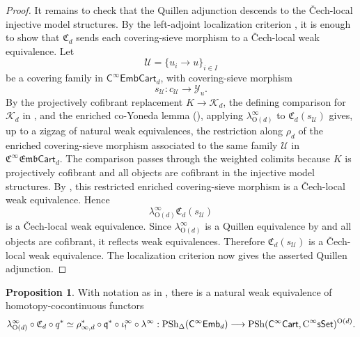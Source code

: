 \documentclass{amsart}
\newcommand{\cat}[1]{\mathsf{#1}}
\newcommand{\sset}{\cat{sSet}}
\newcommand{\CsSet}{\textnormal{C}^{\infty}\sset}
\newcommand{\Cart}{\cat{C}^{\infty}\cat{Cart}}
\newcommand{\fembnoniso}[1]{\cat{C}^{\infty}\cat{Emb}_{#1}}
\newcommand{\fembcartnoniso}[1]{\cat{C}^{\infty}\cat{EmbCart}_{#1}}
\newcommand{\fembcart}[1]{\mathfrak{C}^{\infty}\mathfrak{Emb}\cat{Cart}_{#1}}
\newcommand{\psh}{\mathrm{PSh}}
\newcommand{\spsh}{\mathrm{PSh}_{\Delta}}
\newcommand{\Cc}{\mathfrak{C}}
\newcommand{\Yo}{\mathscr{Y}}
\theoremstyle{definition}
\newtheorem{proposition}[equation]{Proposition}
\numberwithin{equation}{subsection}
\numberwithin{subsubsection}{subsection}
\begin{document}
\begin{proof}
  It remains to check that the Quillen adjunction
   descends to the \v{C}ech-local
  injective model
  structures. By the left-adjoint localization criterion
  \cite[Proposition~3.3.18(1)]{Hir03}, it is enough to show that \(\Cc_d\)
  sends each covering-sieve morphism to a \v{C}ech-local weak equivalence.
  Let
  \[
    \mathcal{U}=\{u_i\longrightarrow u\}_{i\in I}
  \]
  be a covering family in \(\fembcartnoniso{d}\), with covering-sieve
  morphism
  \[
    s_{\mathcal{U}}:c_{\mathcal{U}}\longrightarrow\Yo_u.
  \]
  By the projectively cofibrant replacement \(K\to\mathcal{K}_d\), the
  defining comparison for \(\mathcal{K}_d\) in
  , and the enriched co-Yoneda lemma
  (), applying
  \(\lambda^{\infty}_{\mathrm{O}(d)}\) to
  \(\Cc_d(s_{\mathcal{U}})\) gives, up to a zigzag of natural weak
  equivalences, the restriction along \(\rho_d\) of the enriched
  covering-sieve morphism associated to the same family \(\mathcal{U}\) in
  \(\fembcart{d}\). The comparison passes through the weighted colimits
  because \(K\) is projectively cofibrant and all objects are cofibrant in the
  injective model structures. By
  , this restricted enriched
  covering-sieve morphism is a \v{C}ech-local weak equivalence. Hence
  \[
    \lambda^{\infty}_{\mathrm{O}(d)}\Cc_d(s_{\mathcal{U}})
  \]
  is a \v{C}ech-local weak equivalence. Since
  \(\lambda^{\infty}_{\mathrm{O}(d)}\) is a Quillen equivalence by
   and all objects are cofibrant, it
  reflects
  weak equivalences. Therefore \(\Cc_d(s_{\mathcal{U}})\) is a
  \v{C}ech-local weak equivalence. The localization criterion now gives the
  asserted Quillen adjunction.
\end{proof}

\begin{proposition}\label{prop:Cartesian.realization.comparison}
  With notation as in
  ,
  there is a natural weak equivalence of homotopy-cocontinuous
  functors
  \[
    \lambda^{\infty}_{\mathrm{O}(d)}
    \circ \Cc_d\circ q^{*}
    \simeq
    \rho_{\infty,d}^{*}\circ \mathfrak{q}^{*}\circ
    \iota_{!}^{\infty}\circ\lambda^{\infty}
    :
    \spsh(\fembnoniso{d})
    \longrightarrow
    \psh(\Cart,\CsSet)^{\mathrm{O}(d)}.
  \]
\end{proposition}
\end{document}
